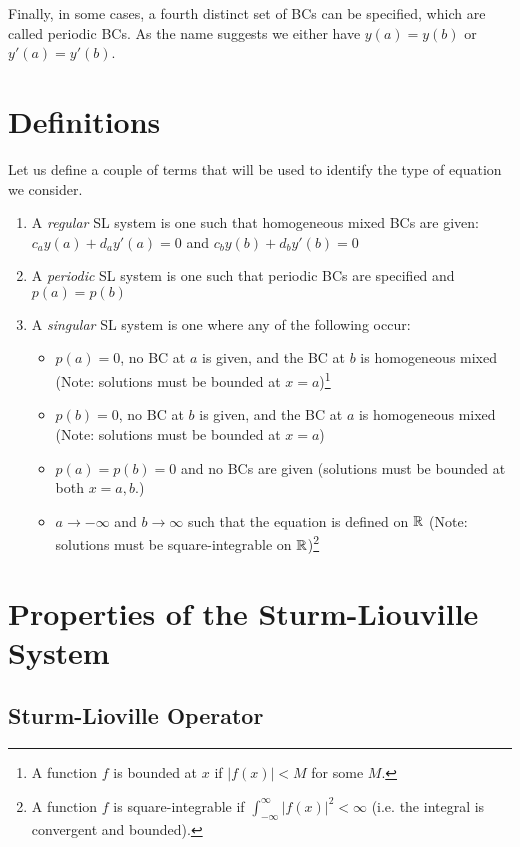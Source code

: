 Finally, in some cases, a fourth distinct set of BCs can be specified, which are called periodic BCs.
As the name suggests we either have $y(a) = y(b)$ or $y'(a) = y'(b)$.

\section{Definitions}

Let us define a couple of terms that will be used to identify the type of equation we consider.

\begin{enumerate}
    \item A \textit{regular} SL system is one such that homogeneous mixed BCs are given: $c_{a}y(a) + d_{a}y'(a) = 0$ and $c_{b}y(b) + d_{b}y'(b) = 0$
    \item A \textit{periodic} SL system is one such that periodic BCs are specified and $p(a) = p(b)$
    \item A \textit{singular} SL system is one where any of the following occur:
    \begin{itemize}
        \item $p(a) = 0$, no BC at $a$ is given, and the BC at $b$ is homogeneous mixed (Note: solutions must be bounded at $x=a$)\footnote{A function $f$ is bounded at $x$ if $|f(x)| < M$ for some $M$.}
        \item $p(b) = 0$, no BC at $b$ is given, and the BC at $a$ is homogeneous mixed (Note: solutions must be bounded at $x = a$)
        \item $p(a) = p(b) = 0$ and no BCs are given (solutions must be bounded at both $x = a,b$.)
        \item $a \rightarrow -\infty$ and $b \rightarrow \infty$ such that the equation is defined on $\mathbb{R}$ (Note: solutions must be square-integrable on $\mathbb{R}$)\footnote{A function $f$ is square-integrable if $\int_{-\infty}^{\infty} |f(x)|^2 < \infty$ (i.e. the integral is convergent and bounded).}
    \end{itemize}
\end{enumerate}


\section{Properties of the Sturm-Liouville System}

\subsection{Sturm-Lioville Operator}

